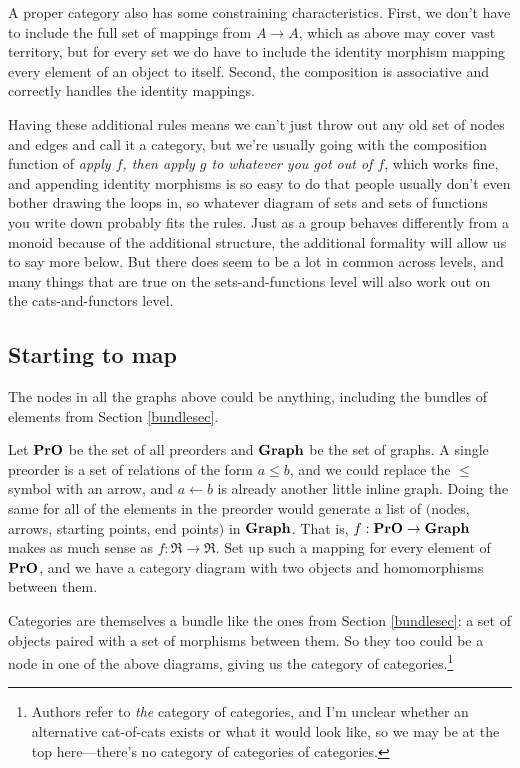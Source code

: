 \documentclass[11pt]{article}
\begin{document}
A proper category also has some
constraining characteristics. First, we don't have to include the full set of mappings from
$A\to A$, which as above may cover vast territory, but for every set we do have to include
the identity morphism mapping every element of an object to itself. Second, the composition
is associative and correctly handles the identity mappings.

Having these additional rules means we can't just throw out any old set of nodes and edges
and call it a category, but we're usually going with the composition function of {\em apply $f$, then
apply $g$ to whatever you got out of $f$}, which works fine, and appending identity
morphisms is so easy to do that people usually don't even bother drawing the loops in,
so whatever diagram of sets and sets of functions you write down probably fits the rules.
Just as a group behaves differently from a monoid because of the additional structure,
the additional formality will allow us to say more below. But there does seem to be a
lot in common across levels, and many things that are true on the sets-and-functions
level will also work out on the cats-and-functors level.

\subsection{Starting to map}
The nodes in all the graphs above could be anything, including the bundles of elements from
Section \ref{bundlesec}.

Let ${\bf PrO}$ be the set of all preorders and ${\bf Graph}$ be the set of graphs. A
single preorder is a set of relations of the form $a \leq b$, and we could replace the $\leq$
symbol with an arrow, and $a\leftarrow b$ is already another little inline graph. 
Doing the same for all of the elements in the preorder would generate a list of
$($nodes, arrows, starting points, end points$)$ in ${\bf Graph}$.
That is, $f:{\bf PrO}\to {\bf Graph}$ makes as much sense as $f:\Re \to \Re$. Set up such
a mapping for every element of ${\bf PrO}$, and we have a category diagram with two
objects and homomorphisms between them.

Categories are themselves a bundle like the ones from Section \ref{bundlesec}: a set
of objects paired with a set of morphisms between them. So they too could be a node in
one of the above diagrams, giving us the category of categories.\footnote{Authors refer
to {\em the} category of categories, and I'm unclear whether an alternative cat-of-cats
exists or what it would look like, so we may be at the top here---there's no category of
categories of categories.}
\end{document}

